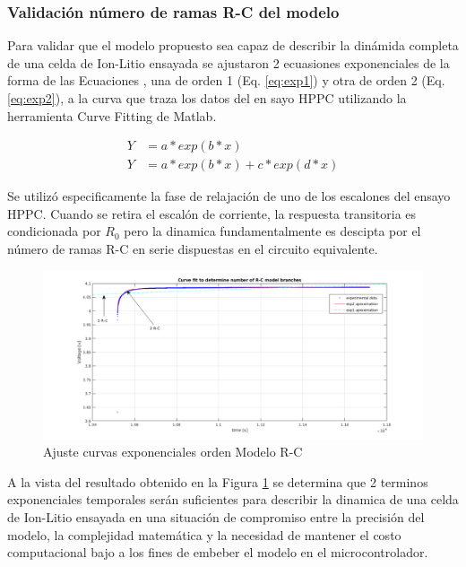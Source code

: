 \documentclass[10pt,a4paper]{article}
\begin{document}
\subsubsection{Validación número de ramas R-C del modelo}

Para validar que el modelo propuesto sea capaz de describir la dinámida completa
de una celda de Ion-Litio ensayada se ajustaron 2 ecuasiones exponenciales de la
forma de las Ecuaciones , una de orden 1 (Eq. \ref{eq:exp1}) y otra de orden 2
(Eq. \ref{eq:exp2}), a la curva que traza los datos del en sayo HPPC utilizando
la herramienta Curve Fitting de Matlab.

\begin{align}
    Y &= a*exp(b*x)\label{eq:exp1}\\
    Y &= a*exp(b*x)+c*exp(d*x)\label{eq:exp2}
\end{align}

Se utilizó especificamente la fase de relajación de uno de los escalones del
ensayo HPPC. Cuando se retira el escalón de corriente, la respuesta transitoria
es condicionada por $R_{0}$ pero la dinamica fundamentalmente es descipta por el
número de ramas R-C en serie dispuestas en el circuito equivalente. 


\begin{figure}[h!]
    \begin{center}
        \includegraphics[width=.9\textwidth]{rc_model_fit.png}
        \caption{Ajuste curvas exponenciales orden Modelo R-C}
        \label{fig:model_fit}
    \end{center}
\end{figure}
\FloatBarrier

A la vista del resultado obtenido en la Figura \ref{fig:model_fit} se determina
que 2 terminos exponenciales temporales serán suficientes para describir la
dinamica de una celda de Ion-Litio ensayada en una situación de compromiso entre
la precisión del modelo, la complejidad matemática y la necesidad de mantener el
costo computacional bajo a los fines de embeber el modelo en el
microcontrolador. 
\end{document}
